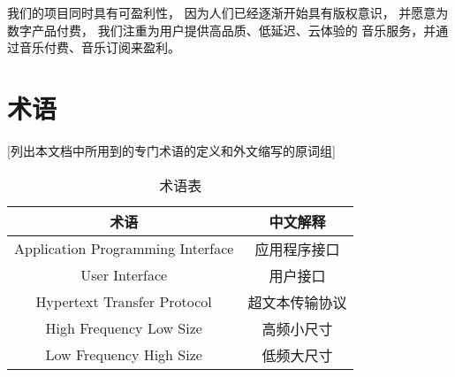 我们的项目同时具有可盈利性，
因为人们已经逐渐开始具有版权意识，
并愿意为数字产品付费，
我们注重为用户提供高品质、低延迟、云体验的
音乐服务，并通过音乐付费、音乐订阅来盈利。

\section{术语}
[列出本文档中所用到的专门术语的定义和外文缩写的原词组]
\begin{table}[htbp]
\centering
\caption{术语表} \label{tab:terminology}
\begin{tabular}{|c|c|}
    \hline
    \hline
    术语 & 中文解释 \\
    \hline
    Application Programming Interface & 应用程序接口\\
    \hline
    User Interface & 用户接口\\
    \hline
    Hypertext Transfer Protocol & 超文本传输协议\\
    \hline
    High Frequency Low Size & 高频小尺寸\\
    \hline
    Low Frequency High Size & 低频大尺寸\\
    \hline
\end{tabular}
\end{table}